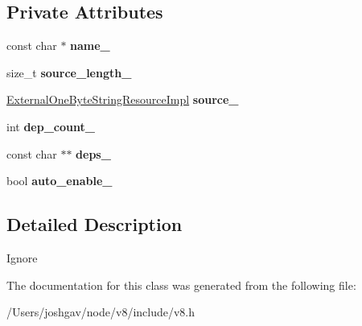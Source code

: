 \subsection*{Private Attributes}
\begin{DoxyCompactItemize}
\item 
const char $\ast$ {\bfseries name\+\_\+}\hypertarget{classv8_1_1_extension_adcdd12a726668185217ad5623e6c5a43}{}\label{classv8_1_1_extension_adcdd12a726668185217ad5623e6c5a43}

\item 
size\+\_\+t {\bfseries source\+\_\+length\+\_\+}\hypertarget{classv8_1_1_extension_a7912969d063d4efe694e0450f6ecd8bc}{}\label{classv8_1_1_extension_a7912969d063d4efe694e0450f6ecd8bc}

\item 
\hyperlink{classv8_1_1_external_one_byte_string_resource_impl}{External\+One\+Byte\+String\+Resource\+Impl} {\bfseries source\+\_\+}\hypertarget{classv8_1_1_extension_ac9242897191bf63ad580715c8469d59b}{}\label{classv8_1_1_extension_ac9242897191bf63ad580715c8469d59b}

\item 
int {\bfseries dep\+\_\+count\+\_\+}\hypertarget{classv8_1_1_extension_ac892d429dd433624cfa4c865613465f5}{}\label{classv8_1_1_extension_ac892d429dd433624cfa4c865613465f5}

\item 
const char $\ast$$\ast$ {\bfseries deps\+\_\+}\hypertarget{classv8_1_1_extension_ae8198584f50edab2521b9344fa3d443f}{}\label{classv8_1_1_extension_ae8198584f50edab2521b9344fa3d443f}

\item 
bool {\bfseries auto\+\_\+enable\+\_\+}\hypertarget{classv8_1_1_extension_a4c7d7140358ffe5c661581af0238ea62}{}\label{classv8_1_1_extension_a4c7d7140358ffe5c661581af0238ea62}

\end{DoxyCompactItemize}


\subsection{Detailed Description}
Ignore 

The documentation for this class was generated from the following file\+:\begin{DoxyCompactItemize}
\item 
/\+Users/joshgav/node/v8/include/v8.\+h\end{DoxyCompactItemize}
